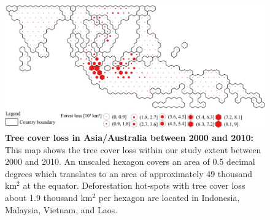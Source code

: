 			\begin{figure}[ht]
				\centering
				\includegraphics[scale=.9]{img/asia_loss_frameless}
				\caption[Tree cover loss in Asia/Australia between 2000 and 2010]{\textbf{Tree cover loss in Asia/Australia between 2000 and 2010:} This map shows the tree cover loss within our study extent between 2000 and 2010. An unscaled hexagon covers an area of 0.5 decimal degrees which translates to an area of approximately 49 thousand km$^2$ at the equator. Deforestation hot-spots with tree cover loss about 1.9 thousand km$^2$ per hexagon are located in Indonesia, Malaysia, Vietnam, and Laos.}
				\label{fig:asia_loss}
			\end{figure}


